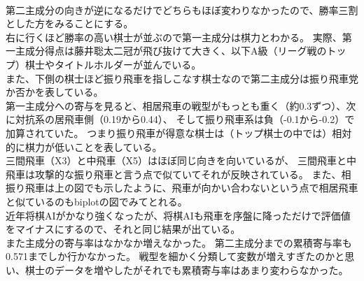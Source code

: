 \documentclass[11pt,a4paper,dvipdfmx]{jsarticle}
\begin{document}
\\
第二主成分の向きが逆になるだけでどちらもほぼ変わりなかったので、勝率三割とした方をみることにする。
\\
右に行くほど勝率の高い棋士が並ぶので第一主成分は棋力とわかる。
実際、第一主成分得点は藤井聡太二冠が飛び抜けて大きく、以下A級（リーグ戦のトップ）棋士やタイトルホルダーが並んでいる。
\\
また、下側の棋士ほど振り飛車を指しこなす棋士なので第二主成分は振り飛車党か否かを表している。
\\
第一主成分への寄与を見ると、相居飛車の戦型がもっとも重く（約0.3ずつ）、次に対抗系の居飛車側（0.19から0.44）、
そして振り飛車系は負（-0.1から-0.2）で加算されていた。
つまり振り飛車が得意な棋士は（トップ棋士の中では）相対的に棋力が低いことを表している。
\\
三間飛車（X3）と中飛車（X5）はほぼ同じ向きを向いているが、
三間飛車と中飛車は攻撃的な振り飛車と言う点で似ていてそれが反映されている。
また、相振り飛車は上の図でも示したように、飛車が向かい合わないという点で相居飛車と似ているのもbiplotの図でみてとれる。
\\
近年将棋AIがかなり強くなったが、将棋AIも飛車を序盤に降っただけで評価値をマイナスにするので、それと同じ結果が出ている。
\\
また主成分の寄与率はなかなか増えなかった。
第二主成分までの累積寄与率も0.571までしか行かなかった。
戦型を細かく分類して変数が増えすぎたのかと思い、棋士のデータを増やしたがそれでも累積寄与率はあまり変わらなかった。
\end{document}
